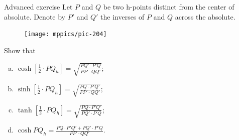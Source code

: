 \begin{thm}{Advanced exercise}\label{ex:cosh}
Let $P$ and $Q$ be two h-points distinct from the center of absolute.
Denote by $P'$ and $Q'$ the inverses of $P$ and $Q$ across the absolute.

\begin{figure}
\centering
\texttt{[image: mppics/pic-204]}
\end{figure}

Show that 
\medskip
\begin{enumerate}[(a)]
\item\label{ex:cosh/2} 
$\displaystyle{\cosh[\tfrac12\cdot PQ_h]=\sqrt{\frac{PQ'\cdot P'Q}{PP'\cdot QQ'}};}$
\medskip
\item\label{ex:coshsinh} 
$\displaystyle{\sinh[\tfrac12\cdot PQ_h]=\sqrt{\frac{PQ\cdot P'Q'}{PP'\cdot QQ'}};}$
\medskip
\item\label{ex:coshtanh} 
$\displaystyle{\tanh[\tfrac12\cdot PQ_h]=\sqrt{\frac{PQ\cdot P'Q'}{PQ'\cdot P'Q}};}$
\medskip
\item\label{ex:coshcosh} 
$\displaystyle{\cosh PQ_h=\frac{PQ\cdot P'Q'+PQ'\cdot P'Q}{PP'\cdot QQ'}.}$
\end{enumerate}

\end{thm}
